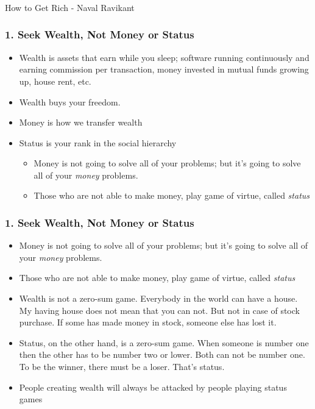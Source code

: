\begin{frame}[fragile]\frametitle{}
\begin{center}
{\Large How to Get Rich - Naval Ravikant}

\end{center}
\end{frame}

\begin{frame}[fragile]
\frametitle{1. Seek Wealth, Not Money or Status}
\begin{itemize}
\item Wealth is assets that earn while you sleep; software running continuously and earning commission per transaction, money invested in mutual funds growing up, house rent, etc.
\item Wealth buys your freedom.

\item Money is how we transfer wealth
\item Status is your rank in the social hierarchy
\begin{itemize}
\item Money is not going to solve all of your problems; but it’s going to solve all of your {\it money} problems.
\item Those who are not able to make money, play game of virtue, called {\it status}
\end{itemize}
\end{itemize}
\end{frame}


\begin{frame}[fragile]
\frametitle{1. Seek Wealth, Not Money or Status}
\begin{itemize}
\item Money is not going to solve all of your problems; but it’s going to solve all of your {\it money} problems.
\item Those who are not able to make money, play game of virtue, called {\it status}
\item Wealth is not a zero-sum game. Everybody in the world can have a house. My having house does not mean that you can not. But not in case of stock purchase. If some has made money in stock, someone else has lost it.
\item Status, on the other hand, is a zero-sum game. When someone is number one then the other has to be number two or lower. Both can not be number one. To be the winner, there must be a loser. That's status.
\item People creating wealth will always be attacked by people playing status games
\end{itemize}


\end{frame}

